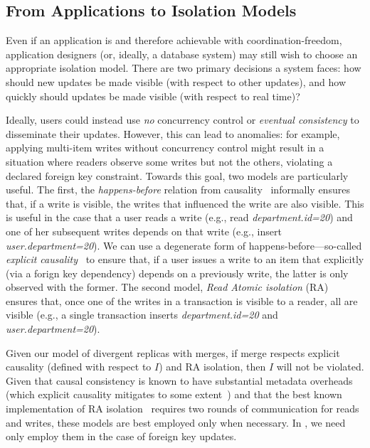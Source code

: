 \subsection{From Applications to Isolation Models}

Even if an application is \iconfluent and therefore achievable with
coordination-freedom, application designers (or, ideally, a database
system) may still wish to choose an appropriate isolation model. There
are two primary decisions a system faces: how should new updates be
made visible (with respect to other updates), and how quickly should
updates be made visible (with respect to real time)?

 Ideally, users could instead use
\textit{no} concurrency control or \textit{eventual consistency} to
disseminate their \iconfluent updates. However, this can lead to
anomalies: for example, applying multi-item writes without concurrency
control might result in a situation where readers observe some writes
but not the others, violating a declared foreign key
constraint. Towards this goal, two models are particularly useful. The
first, the \textit{happens-before} relation from
causality~\cite{lamportclocks} informally ensures that, if a write is
visible, the writes that influenced the write are also visible. This
is useful in the case that a user reads a write (e.g., read
\textit{department.id=20}) and one of her subsequent writes depends on
that write (e.g., insert \textit{user.department=20}). We can use a
degenerate form of happens-before---so-called \textit{explicit
  causality}~\cite{explicit-socc2012} to ensure that, if a user issues
a write to an item that explicitly (via a forign key dependency)
depends on a previously write, the latter is only observed with the
former. The second model, \textit{Read Atomic isolation}
(RA)~\cite{ramp-txns} ensures that, once one of the writes in a
transaction is visible to a reader, all are visible (e.g., a single
transaction inserts \textit{department.id=20} and
\textit{user.department=20}).

Given our \cfree model of divergent replicas with merges, if merge
respects explicit causality (defined with respect to $I$) and RA
isolation, then $I$ will not be violated. Given that causal
consistency is known to have substantial metadata overheads (which
explicit causality mitigates to some extent~\cite{explicit-socc2012})
and that the best known implementation of RA
isolation~\cite{ramp-txns} requires two rounds of communication for
reads and writes, these models are best employed only when
necessary. In \lang, we need only employ them in the case of foreign
key updates.

